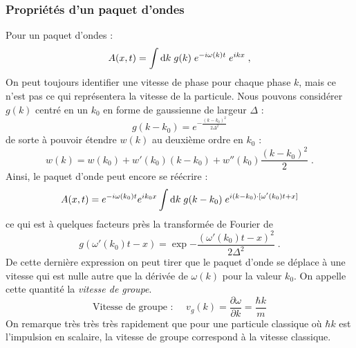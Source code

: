 \documentclass[12pt, a4paper]{book}
\begin{document}
\subsubsection{Propriétés d'un paquet d'ondes}
Pour un paquet d'ondes :
$$A(x, t) = \int \mathrm{d} k \; g(k) \; e^{-i\omega(k) t} \; e^{ikx} \; ,$$
On peut toujours identifier une vitesse de phase pour chaque phase $k$, mais ce n'est pas ce qui représentera la vitesse de la particule. Nous pouvons considérer $g(k)$ centré en un $k_0$ en forme de gaussienne de largeur $\Delta$ :
$$g(k-k_0) = e^{-\frac{(k-k_0)^2}{2\Delta^2}}$$
de sorte à pouvoir étendre $w(k)$ au deuxième ordre en $k_0$ :
$$ w(k) = w(k_0) + w'(k_0) (k-k_0) + w''(k_0) \frac{(k-k_0)^2}{2} \; .$$
Ainsi, le paquet d'onde peut encore se réécrire :
\begin{equation}
A(x,t) = e^{-i\omega(k_0)t} e^{ik_0x} \int \mathrm{d} k \; g(k-k_0) \; e^{i(k-k_0)\cdot [\omega'(k_0) t + x]}
\end{equation}
ce qui est à quelques facteurs près la transformée de Fourier de $$g(\omega'(k_0)t-x) = \exp{-\dfrac{(\omega'(k_0)t-x)^2}{2\Delta^2}} \; .$$
De cette dernière expression on peut tirer que le paquet d'onde se déplace à une vitesse qui est nulle autre que la dérivée de $\omega(k)$ pour la valeur $k_0$. On appelle cette quantité la \textit{vitesse de groupe}.
\begin{equation}
\boxed{
\text{Vitesse de groupe : } \quad v_g(k) = \dfrac{\partial \omega}{\partial k} = \dfrac{\hbar k}{m}
}
\end{equation}
On remarque très très très rapidement que pour une particule classique où $\hbar k$ est l'impulsion en scalaire, la vitesse de groupe correspond à la vitesse classique.
\end{document}
